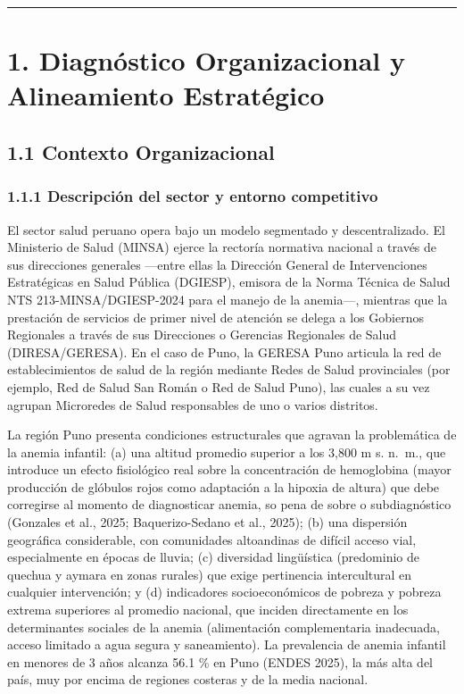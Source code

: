 \documentclass[11pt,a4paper]{article}
\begin{document}
\begin{center}\rule{0.5\linewidth}{0.5pt}\end{center}

\section{1. Diagnóstico Organizacional y Alineamiento Estratégico}\label{diagnuxf3stico-organizacional-y-alineamiento-estratuxe9gico}

\subsection{1.1 Contexto Organizacional}\label{contexto-organizacional}

\subsubsection{1.1.1 Descripción del sector y entorno competitivo}\label{descripciuxf3n-del-sector-y-entorno-competitivo}

El sector salud peruano opera bajo un modelo segmentado y descentralizado. El Ministerio de Salud (MINSA) ejerce la rectoría normativa nacional a través de sus direcciones generales ---entre ellas la Dirección General de Intervenciones Estratégicas en Salud Pública (DGIESP), emisora de la Norma Técnica de Salud NTS 213-MINSA/DGIESP-2024 para el manejo de la anemia---, mientras que la prestación de servicios de primer nivel de atención se delega a los Gobiernos Regionales a través de sus Direcciones o Gerencias Regionales de Salud (DIRESA/GERESA). En el caso de Puno, la GERESA Puno articula la red de establecimientos de salud de la región mediante Redes de Salud provinciales (por ejemplo, Red de Salud San Román o Red de Salud Puno), las cuales a su vez agrupan Microredes de Salud responsables de uno o varios distritos.

La región Puno presenta condiciones estructurales que agravan la problemática de la anemia infantil: (a) una altitud promedio superior a los 3,800 m s. n.~m., que introduce un efecto fisiológico real sobre la concentración de hemoglobina (mayor producción de glóbulos rojos como adaptación a la hipoxia de altura) que debe corregirse al momento de diagnosticar anemia, so pena de sobre o subdiagnóstico (Gonzales et al., 2025; Baquerizo-Sedano et al., 2025); (b) una dispersión geográfica considerable, con comunidades altoandinas de difícil acceso vial, especialmente en épocas de lluvia; (c) diversidad lingüística (predominio de quechua y aymara en zonas rurales) que exige pertinencia intercultural en cualquier intervención; y (d) indicadores socioeconómicos de pobreza y pobreza extrema superiores al promedio nacional, que inciden directamente en los determinantes sociales de la anemia (alimentación complementaria inadecuada, acceso limitado a agua segura y saneamiento). La prevalencia de anemia infantil en menores de 3 años alcanza 56.1 \% en Puno (ENDES 2025), la más alta del país, muy por encima de regiones costeras y de la media nacional.
\end{document}
